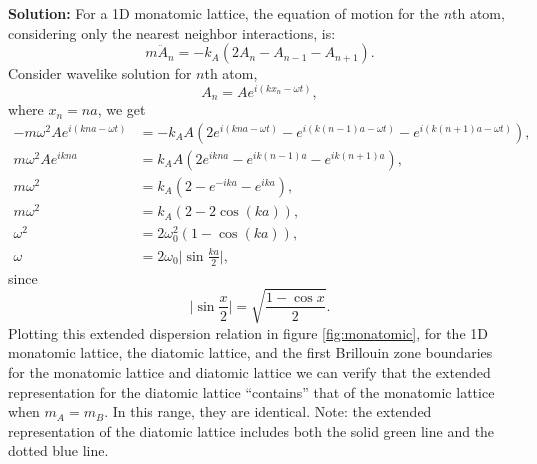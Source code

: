 \documentclass[12pt]{article}
\begin{document}
\textbf{Solution:}
For a 1D monatomic lattice, the equation of motion for the $n$th atom,
considering only the nearest neighbor interactions, is:
\begin{equation}
	m \ddot{A}_n = -k_A (2A_n - A_{n-1} - A_{n+1}).
\end{equation}
Consider wavelike solution for $n$th atom,
\begin{equation}
	A_{n} = A e^{i (k x_n - \omega t)},
\end{equation}
where $x_n = n a$, we get
\begin{align}
	-m \omega^2 A e^{i (k n a - \omega t)} & = -k_A A(2 e^{i (k n a - \omega t)} - e^{i (k (n-1)a - \omega t)} - e^{i (k (n+1)a - \omega t)}), \\
	m \omega^2 A e^{i k n a}               & = k_A A(2 e^{i k n a} - e^{i k (n-1)a} - e^{i k (n+1)a}),                                         \\
	m \omega^2                             & = k_A (2 - e^{-i k a} - e^{i k a}),                                                               \\
	m \omega^2                             & = k_A (2 - 2 \cos(k a)),                                                                          \\
	\omega^2                               & = 2 \omega_0^2 (1 - \cos(k a)),                                                                   \\
	\omega                                 & = 2 \omega_0 \bigg| \sin \frac{k a}{2} \bigg|,
\end{align}
since
\begin{equation}
	\bigg| \sin \frac{x}{2} \bigg| = \sqrt{\frac{1 - \cos x}{2}}.
\end{equation}
Plotting this extended dispersion relation in figure \ref{fig:monatomic}, for the 1D monatomic lattice, the diatomic lattice, and the first
Brillouin zone boundaries for the monatomic lattice and diatomic lattice we can verify that the extended
representation for the diatomic lattice ``contains” that of the monatomic lattice when
$m_A = m_B$. In this range, they are identical.
Note: the extended representation of the diatomic lattice includes both the solid green line and
the dotted blue line.
\end{document}
